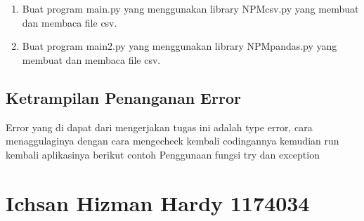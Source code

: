\begin{enumerate}
	
	
	\item Buat program main.py yang menggunakan library NPMcsv.py yang membuat dan membaca file csv.
	
	
	
	\item Buat program main2.py yang menggunakan library NPMpandas.py yang membuat dan membaca file csv.
	
	
	
\end{enumerate}

\subsection{Ketrampilan Penanganan Error}
Error yang di dapat dari mengerjakan tugas ini adalah type error, cara menaggulaginya dengan cara mengecheck kembali codingannya
kemudian run kembali aplikasinya
berikut contoh Penggunaan fungsi try dan exception


\section{Ichsan Hizman Hardy 1174034}
